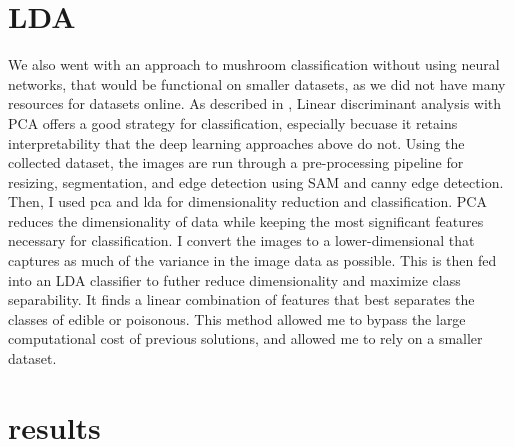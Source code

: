 \documentclass[journal]{IEEEtran}
\begin{document}
\section{LDA}
We also went with an approach to mushroom classification without using neural networks, that would be functional on smaller datasets, as we did not have many resources for datasets online. As described in \cite{lakshika2021}, Linear discriminant analysis with PCA offers a good strategy for classification, especially becuase it retains interpretability that the deep learning approaches above do not. Using the collected dataset, the images are run through a pre-processing pipeline for resizing, segmentation, and edge detection using SAM and canny edge detection. Then, I used pca and lda for dimensionality reduction and classification. PCA reduces the dimensionality of data while keeping the most significant features necessary for classification. I convert the images to a lower-dimensional that captures as much of the variance in the image data as possible. This is then fed into an LDA classifier to futher reduce dimensionality and maximize class separability. It finds a linear combination of features that best separates the classes of edible or poisonous. This method allowed me to bypass the large computational cost of previous solutions, and allowed me to rely on a smaller dataset.
\section{results}
\end{document}
